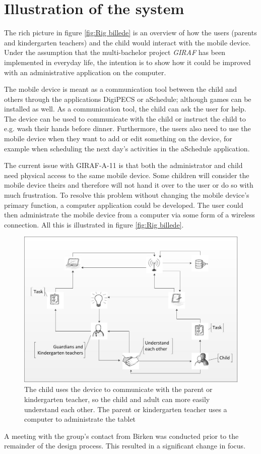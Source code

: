 \section{Illustration of the system}
The rich picture \cite{OOAD} in figure \vref{fig:Rig billede} is an overview of how the users (parents and kindergarten teachers) and the child would interact with the mobile device. Under the assumption that the multi-bachelor project \emph{GIRAF} has been implemented in everyday life, the intention is to show how it could be improved with an administrative application on the computer.

The mobile device is meant as a communication tool between the child and others through the applications DigiPECS or aSchedule; although games can be installed as well. As a communication tool, the child can ask the user for help. The device can be used to communicate with the child or instruct the child to e.g. wash their hands before dinner.
Furthermore, the users also need to use the mobile device when they want to add or edit something on the device, for example when scheduling the next day's activities in the aSchedule application.
 
The current issue with GIRAF-A-11 is that both the administrator and child need physical access to the same mobile device. Some children will consider the mobile device theirs and therefore will not hand it over to the user or do so with much frustration. To resolve this problem without changing the mobile device's primary function, a computer application could be developed. The user could then administrate the mobile device from a computer via some form of a wireless connection. All this is illustrated in figure \vref{fig:Rig billede}. 

\begin{figure}[!ht]
	\centering
		\includegraphics[width=1.00\textwidth]{img/Rig_billede2.jpg}
	\caption{The child uses the device to communicate with the parent or kindergarten teacher, so the child and adult can more easily understand each other. The parent or kindergarten teacher uses a computer to administrate the tablet}
	\label{fig:Rig billede}
\end{figure}
\newpage

A meeting with the group's contact from Birken was conducted prior to the remainder of the design process. This resulted in a significant change in focus.
    